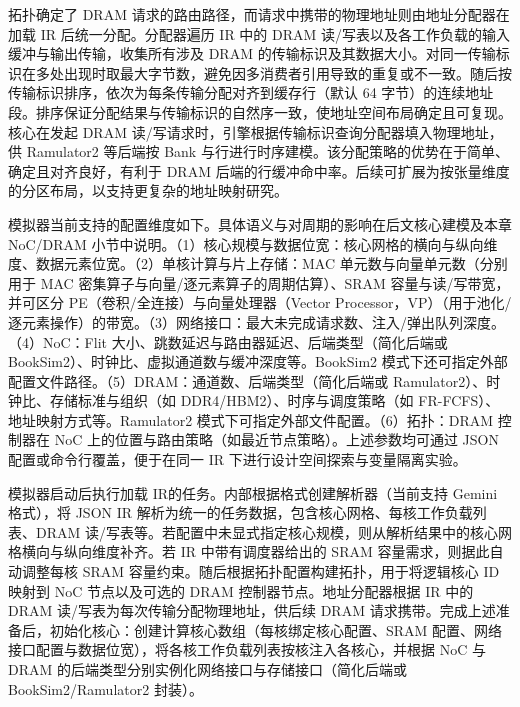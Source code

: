 拓扑确定了 DRAM 请求的路由路径，而请求中携带的物理地址则由地址分配器在加载 IR 后统一分配。分配器遍历 IR 中的 DRAM 读/写表以及各工作负载的输入缓冲与输出传输，收集所有涉及 DRAM 的传输标识及其数据大小。对同一传输标识在多处出现时取最大字节数，避免因多消费者引用导致的重复或不一致。随后按传输标识排序，依次为每条传输分配对齐到缓存行（默认 64 字节）的连续地址段。排序保证分配结果与传输标识的自然序一致，使地址空间布局确定且可复现。核心在发起 DRAM 读/写请求时，引擎根据传输标识查询分配器填入物理地址，供 Ramulator2 等后端按 Bank 与行进行时序建模。该分配策略的优势在于简单、确定且对齐良好，有利于 DRAM 后端的行缓冲命中率。后续可扩展为按张量维度的分区布局，以支持更复杂的地址映射研究。


模拟器当前支持的配置维度如下。具体语义与对周期的影响在后文核心建模及本章 NoC/DRAM 小节中说明。（1）核心规模与数据位宽：核心网格的横向与纵向维度、数据元素位宽。（2）单核计算与片上存储：MAC 单元数与向量单元数（分别用于 MAC 密集算子与向量/逐元素算子的周期估算）、SRAM 容量与读/写带宽，并可区分 PE（卷积/全连接）与向量处理器（Vector Processor，VP）（用于池化/逐元素操作）的带宽。（3）网络接口：最大未完成请求数、注入/弹出队列深度。（4）NoC：Flit 大小、跳数延迟与路由器延迟、后端类型（简化后端或 BookSim2）、时钟比、虚拟通道数与缓冲深度等。BookSim2 模式下还可指定外部配置文件路径。（5）DRAM：通道数、后端类型（简化后端或 Ramulator2）、时钟比、存储标准与组织（如 DDR4/HBM2）、时序与调度策略（如 FR-FCFS）、地址映射方式等。Ramulator2 模式下可指定外部文件配置。（6）拓扑：DRAM 控制器在 NoC 上的位置与路由策略（如最近节点策略）。上述参数均可通过 JSON 配置或命令行覆盖，便于在同一 IR 下进行设计空间探索与变量隔离实验。


模拟器启动后执行加载 IR的任务。内部根据格式创建解析器（当前支持 Gemini 格式），将 JSON IR 解析为统一的任务数据，包含核心网格、每核工作负载列表、DRAM 读/写表等。若配置中未显式指定核心规模，则从解析结果中的核心网格横向与纵向维度补齐。若 IR 中带有调度器给出的 SRAM 容量需求，则据此自动调整每核 SRAM 容量约束。随后根据拓扑配置构建拓扑，用于将逻辑核心 ID 映射到 NoC 节点以及可选的 DRAM 控制器节点。地址分配器根据 IR 中的 DRAM 读/写表为每次传输分配物理地址，供后续 DRAM 请求携带。完成上述准备后，初始化核心：创建计算核心数组（每核绑定核心配置、SRAM 配置、网络接口配置与数据位宽），将各核工作负载列表按核注入各核心，并根据 NoC 与 DRAM 的后端类型分别实例化网络接口与存储接口（简化后端或 BookSim2/Ramulator2 封装）。

